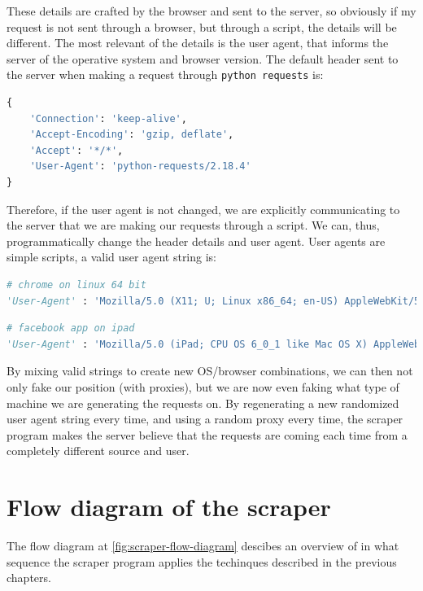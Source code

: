 \documentclass[LaM,binding=0.6cm]{sapthesis}
\begin{document}
These details are crafted by the browser and sent to the server, so obviously if my request is not sent through a browser, but through a script, the details will be different. The most relevant of the details is the user agent, that informs the server of the operative system and browser version. The default header sent to the server when making a request through \texttt{python requests} is:

\begin{lstlisting}[language=python]
{
	'Connection': 'keep-alive', 
	'Accept-Encoding': 'gzip, deflate', 
	'Accept': '*/*', 
	'User-Agent': 'python-requests/2.18.4'
}
\end{lstlisting} 

Therefore, if the user agent is not changed, we are explicitly communicating to the server that we are making our requests through a script.
We can, thus, programmatically change the header details and user agent. User agents are simple scripts, a valid user agent string is:

\begin{lstlisting}[language=python]
# chrome on linux 64 bit
'User-Agent' : 'Mozilla/5.0 (X11; U; Linux x86_64; en-US) AppleWebKit/540.0 (KHTML,like Gecko) Chrome/9.1.0.0 Safari/540.0'
\end{lstlisting}

\begin{lstlisting}[language=python]
# facebook app on ipad
'User-Agent' : 'Mozilla/5.0 (iPad; CPU OS 6_0_1 like Mac OS X) AppleWebKit/536.26 (KHTML, like Gecko) Mobile/10A523 [FBAN/FBIOS;FBAV/6.0.1;FBBV/180945;FBDV/iPad2,1;FBMD/iPad;FBSN/iPhone OS;FBSV/6.0.1;FBSS/1; FBCR/;FBID/tablet;FBLC/en_US;FBOP/1]'
\end{lstlisting}

By mixing valid strings to create new OS/browser combinations, we can then not only fake our position (with proxies), but we are now even faking what type of machine we are generating the requests on. By regenerating a new randomized user agent string every time, and using a random proxy every time, the scraper program makes the server believe that the requests are coming each time from a completely different source and user.

\section{Flow diagram of the scraper}

The flow diagram at \ref{fig:scraper-flow-diagram} descibes an overview of in what sequence the scraper program applies the techinques described in the previous chapters.
\end{document}
